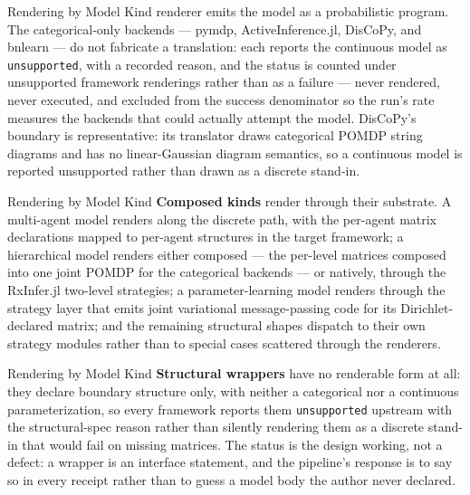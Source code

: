 \documentclass[
  ignorenonframetext,
]{beamer}
\begin{document}
\begin{frame}{Rendering by Model Kind}
renderer emits the model as a probabilistic program. The
categorical-only backends --- pymdp, ActiveInference.jl, DisCoPy, and
bnlearn --- do not fabricate a translation: each reports the continuous
model as \texttt{unsupported}, with a recorded reason, and the status is
counted under unsupported framework renderings rather than as a failure
--- never rendered, never executed, and excluded from the success
denominator so the run's rate measures the backends that could actually
attempt the model. DisCoPy's boundary is representative: its translator
draws categorical POMDP string diagrams and has no linear-Gaussian
diagram semantics, so a continuous model is reported unsupported rather
than drawn as a discrete stand-in.

\end{frame}

\begin{frame}{Rendering by Model Kind}
\textbf{Composed kinds} render through their substrate. A multi-agent
model renders along the discrete path, with the per-agent matrix
declarations mapped to per-agent structures in the target framework; a
hierarchical model renders either composed --- the per-level matrices
composed into one joint POMDP for the categorical backends --- or
natively, through the RxInfer.jl two-level strategies; a
parameter-learning model renders through the strategy layer that emits
joint variational message-passing code for its Dirichlet-declared
matrix; and the remaining structural shapes dispatch to their own
strategy modules rather than to special cases scattered through the
renderers.

\end{frame}

\begin{frame}{Rendering by Model Kind}
\textbf{Structural wrappers} have no renderable form at all: they
declare boundary structure only, with neither a categorical nor a
continuous parameterization, so every framework reports them
\texttt{unsupported} upstream with the structural-spec reason rather
than silently rendering them as a discrete stand-in that would fail on
missing matrices. The status is the design working, not a defect: a
wrapper is an interface statement, and the pipeline's response is to say
so in every receipt rather than to guess a model body the author never
declared.

\end{frame}
\end{document}
